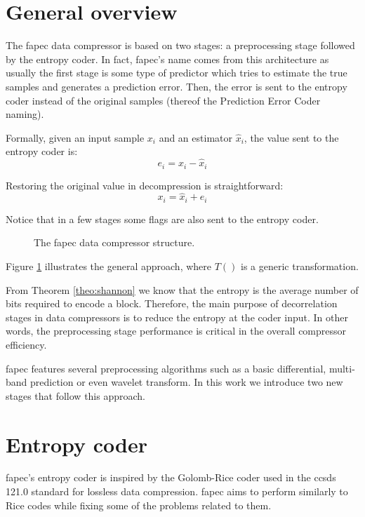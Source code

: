 \section{General overview}
The \acrshort{fapec} data compressor is based on two stages: a preprocessing stage followed by the entropy coder. In fact, \acrshort{fapec}'s name comes from this architecture as usually the first stage is some type of predictor which tries to estimate the true samples and generates a prediction error. Then, the error is sent to the entropy coder instead of the original samples (thereof the Prediction Error Coder naming).

Formally, given an input sample $x_i$ and an estimator $\hat{x}_i$, the value sent to the entropy coder is:
\begin{equation}
e_i = x_i - \hat{x}_i
\end{equation}

Restoring the original value in decompression is straightforward:
\begin{equation}
x_i = \hat{x}_i + e_i
\end{equation}

Notice that in a few stages some flags are also sent to the entropy coder.

\begin{figure}[h!]
	\begin{center}
		\scalebox{.615}{}
	\end{center}
	\caption{The \acrshort{fapec} data compressor structure.}
	\label{fig:fapec_structure}
\end{figure}

Figure \ref{fig:fapec_structure} illustrates the general approach, where $T()$ is a generic transformation.

From Theorem \ref{theo:shannon} we know that the entropy is the average number of bits required to encode a block. Therefore, the main purpose of decorrelation stages in data compressors is to reduce the entropy at the coder input. In other words, the preprocessing stage performance is critical in the overall compressor efficiency.

\acrshort{fapec} features several preprocessing algorithms such as a basic differential, multi-band prediction or even wavelet transform. In this work we introduce two new stages that follow this approach.

\section{Entropy coder} \label{sec:entropy_coder}
\acrshort{fapec}'s entropy coder is inspired by the Golomb-Rice coder used in the \acrshort{ccsds} 121.0 standard for lossless data compression. \acrshort{fapec} aims to perform similarly to Rice codes while fixing some of the problems related to them.


